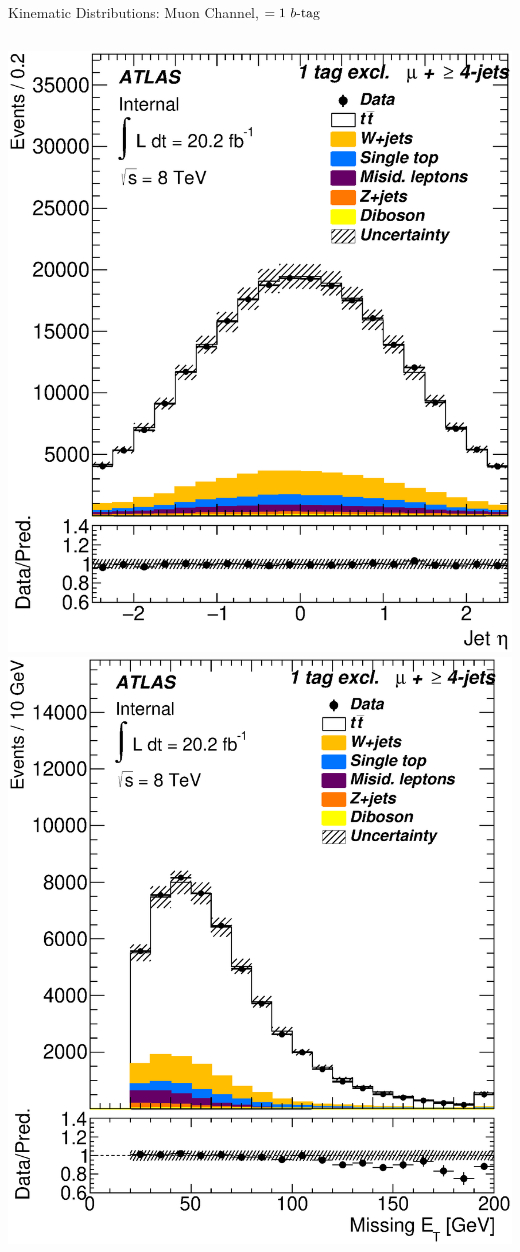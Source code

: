 \documentclass{beamer}
\begin{document}
{\begin{frame}{Kinematic Distributions: Muon Channel, $=1\text{ } \lowercase{ b\text{-tag}}$}
\begin{columns}
      \includegraphics[width=.95\textwidth]{../chapters/whel/figures/control_Plots2/bTag_1excl/JetEta_mu}
      \includegraphics[width=.95\textwidth]{../chapters/whel/figures/control_Plots2/bTag_1excl/MissingEt_mu}\\

\end{columns}
\end{frame}}
\end{document}
